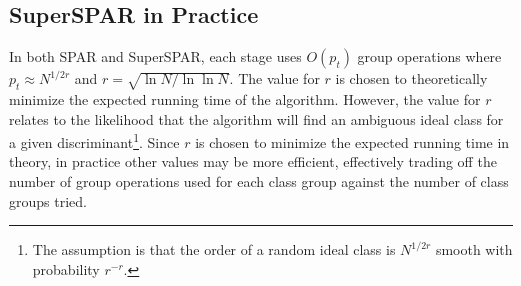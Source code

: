 \documentclass{ucalgthes1}
\theoremstyle{definition}
\DeclareMathOperator{\ord}{ord}
\newcommand{\floor}[1]{\left\lfloor #1 \right\rfloor}
\newcommand{\aclass}{[\mathfrak a]}
\newcommand{\cclass}{[\mathfrak c]}
\begin{document}

\subsection{SuperSPAR in Practice}

In both SPAR and SuperSPAR, each stage uses $O(p_t)$ group operations where $p_t \approx N^{1/2r}$ and $r = \sqrt{\ln N / \ln \ln N}$.  The value for $r$ is chosen to theoretically minimize the expected running time of the algorithm.  However, the value for $r$ relates to the likelihood that the algorithm will find an ambiguous ideal class for a given discriminant\footnote{The assumption is that the order of a random ideal class is $N^{1/2r}$ smooth with probability $r^{-r}$.}.  Since $r$ is chosen to minimize the expected running time in theory, in practice other values may be more efficient, effectively trading off the number of group operations used for each class group against the number of class groups tried.
\end{document}
